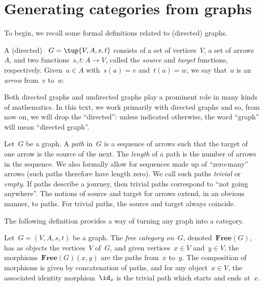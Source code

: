 

\section{Generating categories from graphs}
\label{sec:catsfromgraphs}
To begin, we recall some formal definitions related to (directed) graphs.


\begin{definition}[Graph]
  \label{def:graph}
  A (directed) \emph{}~$G=\tup{V,A,s,t}$ consists of a set of vertices~$V$, a set of arrows~$A$, and two functions~$s,t\colon A\to V$, called the \emph{source} and \emph{target} functions, respectively. Given~$a\in A$ with~$s(a)=v$ and~$t(a)=w$, we say that~$a$ is an \emph{arrow} from~$v$ to~$w$.
\end{definition}

\begin{remark}
  Both directed graphs and undirected graphs play a prominent role in many kinds of mathematics. In this text, we work primarily with directed graphs and so, from now on, we will drop the ``directed'': unless indicated otherwise, the word ``graph'' will mean ``directed graph''.
\end{remark}

\begin{definition}[Path]
  \label{def:path}
  Let~$G$ be a graph. A \emph{path} in~$G$ is a sequence of arrows such that the target of one arrow is the source of the next. The \emph{length} of a path is the number of arrows in the sequence. We also formally allow for sequences made up of ``zero-many'' arrows (such paths therefore have length zero). We call such paths \emph{trivial} or \emph{empty}. If paths describe a journey, then trivial paths correspond to ``not going anywhere''. The notions of source and target for arrows extend, in an obvious manner, to paths. For trivial paths, the source and target always coincide.
\end{definition}

The following definition provides a way of turning any graph into a category.

\begin{ctdefinition}
  \label{def:free-category}
  Let~$G=(V,A,s,t)$ be a graph. The \emph{free category on~$G$}, denoted~$\mathbf{Free}(G)$, has as objects the vertices~$V$ of~$G$, and given vertices~$x\in V$ and~$y\in V$, the morphisms~$\mathbf{Free}(G)(x,y)$ are the paths from~$x$ to~$y$.
  The composition of morphisms is given by concatenation of paths, and for any object~$x \in V$, the associated identity morphism~$\id_x$ is the trivial path which starts and ends at~$x$.
\end{ctdefinition}

